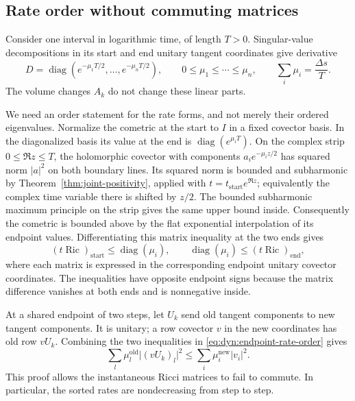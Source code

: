\documentclass[11pt]{article}
\theoremstyle{definition}
\theoremstyle{remark}
\DeclareMathOperator{\Ric}{Ric}
\DeclareMathOperator{\diag}{diag}
\newcommand{\abs}[1]{\lvert#1\rvert}
\numberwithin{equation}{section}
\begin{document}
\subsection{Rate order without commuting matrices}

Consider one interval in logarithmic time, of length $T>0$.
Singular-value decompositions in its start and end unitary tangent
coordinates give derivative
\begin{equation}
 D=\diag(e^{-\mu_1T/2},\ldots,e^{-\mu_nT/2}),\qquad
 0\le\mu_1\le\cdots\le\mu_n,\qquad
 \sum_i\mu_i=\frac{\Delta s}{T}.
 \label{eq:dyn:diagonal-rates}
\end{equation}
The volume changes $A_k$ do not change these linear parts.

We need an order statement for the rate forms, and not merely their
ordered eigenvalues.  Normalize the cometric at the start to $I$ in a
fixed covector basis.  In the diagonalized basis its value at the end
is $\diag(e^{\mu_iT})$.  On the complex strip $0\le\Re z\le T$, the
holomorphic covector with components $a_i e^{-\mu_i z/2}$ has squared
norm $\abs a^2$ on both boundary lines.  Its squared norm is bounded
and subharmonic by Theorem~\ref{thm:joint-positivity}, applied with
$t=t_{\mathrm{start}}e^{\Re z}$; equivalently the complex time variable
there is shifted by $z/2$.  The bounded subharmonic maximum principle
on the strip gives the same upper bound inside.  Consequently the
cometric is bounded above by the flat exponential interpolation of its
endpoint values.  Differentiating this matrix inequality at the two
ends gives
\begin{equation}
 (t\Ric)_{\mathrm{start}}\le\diag(\mu_i),\qquad
 \diag(\mu_i)\le(t\Ric)_{\mathrm{end}},
 \label{eq:dyn:endpoint-rate-order}
\end{equation}
where each matrix is expressed in the corresponding endpoint unitary
covector coordinates.  The inequalities have opposite endpoint signs
because the matrix difference vanishes at both ends and is
nonnegative inside.

At a shared endpoint of two steps, let $U_k$ send old tangent
components to new tangent components.  It is unitary; a row covector
$v$ in the new coordinates has old row $vU_k$.  Combining the two
inequalities in \eqref{eq:dyn:endpoint-rate-order} gives
\begin{equation}
 \sum_l\mu_l^{\mathrm{old}}\abs{(vU_k)_l}^2
 \le\sum_i\mu_i^{\mathrm{new}}\abs{v_i}^2.
 \label{eq:dyn:loewner-jump}
\end{equation}
This proof allows the instantaneous Ricci matrices to fail to commute.
In particular, the sorted rates are nondecreasing from step to step.
\end{document}
